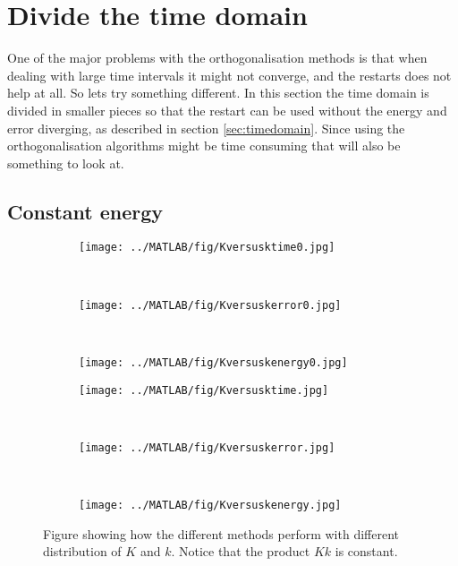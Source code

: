 \section{Divide the time domain}%

One of the major problems with the orthogonalisation methods is that when dealing with large time intervals it might not converge, and the restarts does not help at all. So lets try something different. In this section the time domain is divided in smaller pieces so that the restart can be used without the energy and error diverging, as described in section \ref{sec:timedomain}. Since using the orthogonalisation algorithms might be time consuming that will also be something to look at. 

\subsection{Constant energy}%
\begin{figure}[H]
        \centering
		\begin{subfigure}[b]{0.3\textwidth}
                \texttt{[image: ../MATLAB/fig/Kversusktime0.jpg]}
                \caption{  }
                \label{fig:Kversusktime0}
        \end{subfigure}
        ~
        \begin{subfigure}[b]{0.3\textwidth}
                \texttt{[image: ../MATLAB/fig/Kversuskerror0.jpg]}
                \caption{  }
                \label{fig:Kversuskerror0}
        \end{subfigure}
        ~
        \begin{subfigure}[b]{0.3\textwidth}
                \texttt{[image: ../MATLAB/fig/Kversuskenergy0.jpg]}
                \caption{  }
                \label{fig:Kversuskenergy0}
        \end{subfigure}
        
        \begin{subfigure}[b]{0.3\textwidth}
                \texttt{[image: ../MATLAB/fig/Kversusktime.jpg]}
                \caption{  }
                \label{fig:Kversusktime}
        \end{subfigure}
        ~
        \begin{subfigure}[b]{0.3\textwidth}
                \texttt{[image: ../MATLAB/fig/Kversuskerror.jpg]}
                \caption{  }
                \label{fig:Kversuskerror}
        \end{subfigure}
        ~
        \begin{subfigure}[b]{0.3\textwidth}
                \texttt{[image: ../MATLAB/fig/Kversuskenergy.jpg]}
                \caption{  }
                \label{fig:Kversuskenergy}
        \end{subfigure}
        \caption{Figure showing how the different methods perform with different distribution of $K$ and $k$. Notice that the product $Kk$ is constant. }
        \label{fig:Kversusk}
\end{figure}
